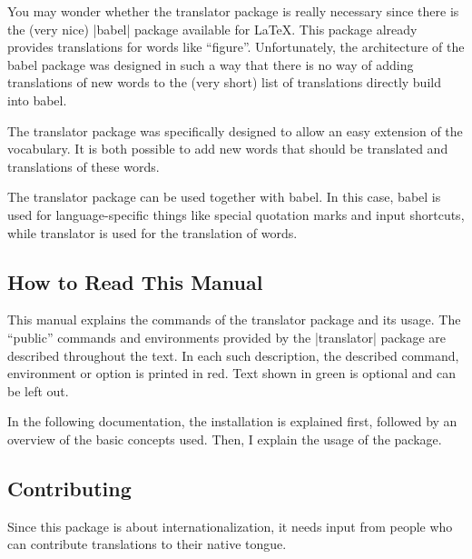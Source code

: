 \documentclass{ltxdoc}
\begin{document}
You may wonder whether the translator package is really necessary
since there is the (very nice) |babel| package available for
\LaTeX. This package already provides translations for words like
``figure''. Unfortunately, the architecture of the babel package was
designed in such a way that there is no way of adding translations of
new words to the (very short) list of translations directly build into
babel.

The translator package was specifically designed to allow an easy
extension of the vocabulary. It is both possible to add new words that
should be translated and translations of these words.

The translator package can be used together with babel. In this case,
babel is used for language-specific things like special quotation
marks and input shortcuts, while translator is used for the
translation of words.  



\subsection{How to Read This Manual}

This manual explains the commands of the translator package and its
usage. The ``public'' commands and environments provided by the |translator|
package are described throughout the text. In each such description, the
described command, environment or option is printed in red. Text shown
in green is optional and can be left out.

In the following documentation, the installation is explained first,
followed by an overview of the basic concepts used. Then, I explain
the usage of the package.



\subsection{Contributing}

Since this package is about internationalization, it needs input from
people who can contribute translations to their native tongue.
\end{document}
